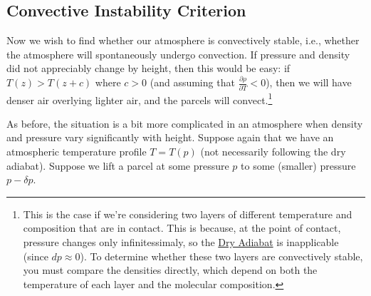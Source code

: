 \subsection{Convective Instability Criterion}

Now we wish to find whether our atmosphere is convectively stable, i.e., whether the atmosphere will spontaneously undergo convection. If pressure and density did not appreciably change by height, then this would be easy: if $T(z)>T(z+c)$ where $c>0$ (and assuming that $\frac{\partial \rho}{\partial T}<0$), then we will have denser air overlying lighter air, and the parcels will convect.\footnote{
    This is the case if we're considering two layers of different temperature and composition that are in contact. This is because, at the point of contact, pressure changes only infinitessimaly, so the \hyperref[Dry Adiabat]{Dry Adiabat} is inapplicable (since $dp\approx0$). To determine whether these two layers are convectively stable, you must compare the densities directly, which depend on both the temperature of each layer and the molecular composition.
}

As before, the situation is a bit more complicated in an atmosphere when density and pressure vary significantly with height. Suppose again that we have an atmospheric temperature profile $T=T(p)$ (not necessarily following the dry adiabat). Suppose we lift a parcel at some pressure $p$ to some (smaller) pressure $p-\delta p$.


